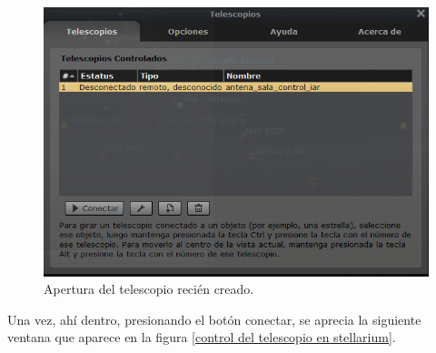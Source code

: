 \begin{figure}[ht!]
	\centering
	\includegraphics[scale=0.6]{rotador_stellarium} 
	\caption{Apertura del telescopio recién creado.}
	\label{fig:rotador_stellarium_conn}
\end{figure}
Una vez, ahí dentro, presionando el botón conectar, se aprecia la siguiente ventana que aparece en la figura \ref{control del telescopio en stellarium}.  

